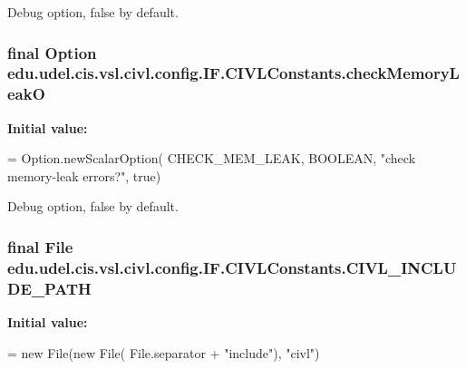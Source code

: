 Debug option, false by default. 

\hypertarget{classedu_1_1udel_1_1cis_1_1vsl_1_1civl_1_1config_1_1IF_1_1CIVLConstants_acc813f4d9dd59a8526b4fcb80225b01a}{}
\subsubsection[{check\+Memory\+Leak\+O}]{\setlength{\rightskip}{0pt plus 5cm}final Option edu.\+udel.\+cis.\+vsl.\+civl.\+config.\+I\+F.\+C\+I\+V\+L\+Constants.\+check\+Memory\+Leak\+O\hspace{0.3cm}{\ttfamily [static]}}\label{classedu_1_1udel_1_1cis_1_1vsl_1_1civl_1_1config_1_1IF_1_1CIVLConstants_acc813f4d9dd59a8526b4fcb80225b01a}
{\bfseries Initial value\+:}
\begin{DoxyCode}
= Option.newScalarOption(
            CHECK\_MEM\_LEAK, BOOLEAN, \textcolor{stringliteral}{"check memory-leak errors?"}, \textcolor{keyword}{true})
\end{DoxyCode}


Debug option, false by default. 

\hypertarget{classedu_1_1udel_1_1cis_1_1vsl_1_1civl_1_1config_1_1IF_1_1CIVLConstants_a258b69dc6d73c0d5c9f7f36542d11917}{}
\subsubsection[{C\+I\+V\+L\+\_\+\+I\+N\+C\+L\+U\+D\+E\+\_\+\+P\+A\+T\+H}]{\setlength{\rightskip}{0pt plus 5cm}final File edu.\+udel.\+cis.\+vsl.\+civl.\+config.\+I\+F.\+C\+I\+V\+L\+Constants.\+C\+I\+V\+L\+\_\+\+I\+N\+C\+L\+U\+D\+E\+\_\+\+P\+A\+T\+H\hspace{0.3cm}{\ttfamily [static]}}\label{classedu_1_1udel_1_1cis_1_1vsl_1_1civl_1_1config_1_1IF_1_1CIVLConstants_a258b69dc6d73c0d5c9f7f36542d11917}
{\bfseries Initial value\+:}
\begin{DoxyCode}
= \textcolor{keyword}{new} File(\textcolor{keyword}{new} File(
            File.separator + \textcolor{stringliteral}{"include"}), \textcolor{stringliteral}{"civl"})
\end{DoxyCode}


